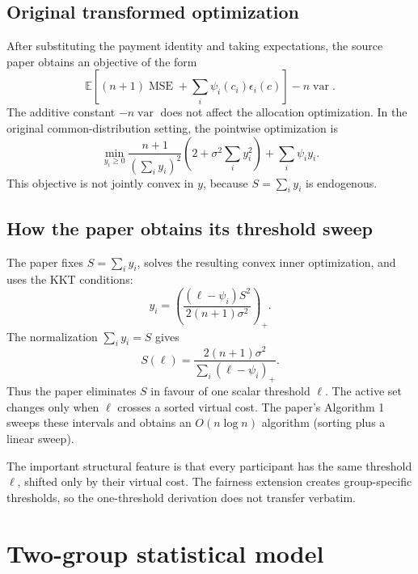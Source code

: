 \documentclass[11pt,a4paper]{article}
\newcommand{\E}{\mathbb{E}}
\newcommand{\1}{\mathbf{1}}
\newcommand{\MSE}{\operatorname{MSE}}
\begin{document}
\subsection{Original transformed optimization}

After substituting the payment identity and taking expectations, the
source paper obtains an objective of the form
\begin{equation}
  \E\left[
    (n+1)\MSE+\sum_i\psi_i(c_i)\epsilon_i(c)
  \right]-n\operatorname{var}.
\end{equation}
The additive constant \(-n\operatorname{var}\) does not affect the
allocation optimization. In the original common-distribution setting,
the pointwise optimization is
\begin{equation}
  \min_{y_i\geq0}
  \frac{n+1}{(\sum_i y_i)^2}
  \left(2+\sigma^2\sum_i y_i^2\right)
  +\sum_i\psi_i y_i.
  \label{eq:original-objective}
\end{equation}
This objective is not jointly convex in \(y\), because
\(S=\sum_i y_i\) is endogenous.

\subsection{How the paper obtains its threshold sweep}

The paper fixes \(S=\sum_i y_i\), solves the resulting convex inner
optimization, and uses the KKT conditions:
\begin{equation}
  y_i=
  \left(
    \frac{(\ell-\psi_i)S^2}
    {2(n+1)\sigma^2}
  \right)_+.
  \label{eq:paper-kkt}
\end{equation}
The normalization \(\sum_i y_i=S\) gives
\begin{equation}
  S(\ell)
  =
  \frac{2(n+1)\sigma^2}
       {\sum_i(\ell-\psi_i)_+}.
  \label{eq:paper-S}
\end{equation}
Thus the paper eliminates \(S\) in favour of one scalar threshold
\(\ell\). The active set changes only when \(\ell\) crosses a sorted virtual
cost. The paper's Algorithm 1 sweeps these intervals and obtains an
\(O(n\log n)\) algorithm (sorting plus a linear sweep).

The important structural feature is that every participant has the same
threshold \(\ell\), shifted only by their virtual cost. The fairness
extension creates group-specific thresholds, so the one-threshold
derivation does not transfer verbatim.

\section{Two-group statistical model}
\end{document}
